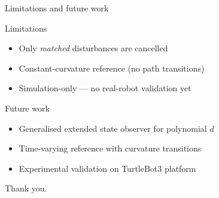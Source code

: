 \documentclass[10pt,aspectratio=169]{beamer}
\begin{document}
\begin{frame}{Limitations and future work}
  \begin{block}{Limitations}
    \begin{itemize}
      \item Only \emph{matched} disturbances are cancelled
      \item Constant-curvature reference (no path transitions)
      \item Simulation-only — no real-robot validation yet
    \end{itemize}
  \end{block}

  \begin{block}{Future work}
    \begin{itemize}
      \item Generalised extended state observer for polynomial $d$
            \cite{li2012generalized}
      \item Time-varying reference with curvature transitions
      \item Experimental validation on TurtleBot3 platform
    \end{itemize}
  \end{block}
\end{frame}

\begin{frame}[standout]
  Thank you.\\[1em]
\end{frame}

\appendix
\end{document}
